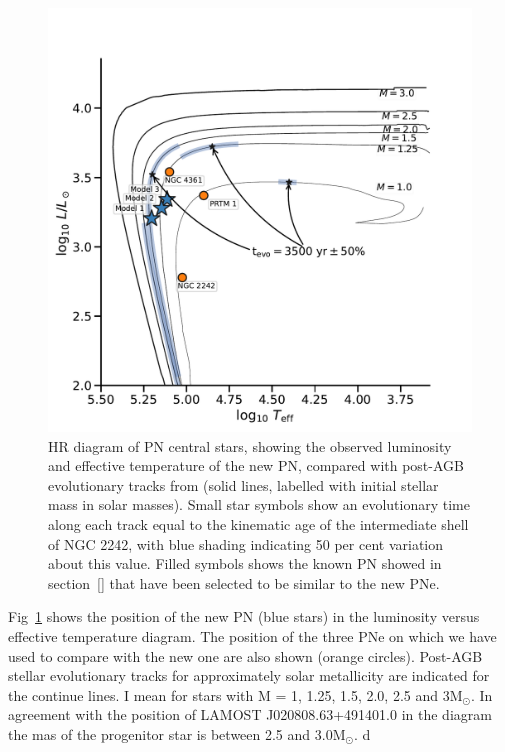 \documentclass[fleqn,usenatbib]{mnras}
\begin{document}
{\begin{figure}
\centering
  \includegraphics[width=\linewidth]{Figs/hr-planetarieNebula}
  \caption{HR diagram of PN central stars, showing the observed luminosity
and effective temperature of the new PN, compared with
post-AGB evolutionary tracks from \citet{Miller:2016} (solid lines,
labelled with initial stellar mass in solar masses). Small star symbols show
an evolutionary time along each track equal to the kinematic age of the
intermediate shell of NGC 2242, with blue shading indicating 50 per cent
variation about this value.  Filled symbols shows the known PN showed in section~\ref{}
that have been selected to be  similar to the new PNe.} 
 \label{fig:track-evolutive}
\end{figure}

Fig~\ref{fig:track-evolutive} shows the position of the new PN (blue stars) in the luminosity
versus effective temperature diagram. The position of the three PNe on which we have used to
compare with the new one are also shown (orange circles). Post-AGB stellar evolutionary tracks for
approximately solar metallicity \citep{Miller:2016} are indicated for the continue lines.
I mean for stars with M = 1, 1.25, 1.5, 2.0, 2.5 and 3M$_{\odot}$. In agreement with the position of LAMOST
J020808.63+491401.0 in the diagram the mas of the progenitor star is between 2.5 and 3.0M$_{\odot}$.
 d
}
\end{document}
